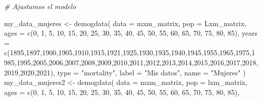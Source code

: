 \documentclass[
]{article}
\newenvironment{Shaded}{\begin{snugshade}}{\end{snugshade}}
\newcommand{\AttributeTok}[1]{\textcolor[rgb]{0.77,0.63,0.00}{#1}}
\newcommand{\CommentTok}[1]{\textcolor[rgb]{0.56,0.35,0.01}{\textit{#1}}}
\newcommand{\DecValTok}[1]{\textcolor[rgb]{0.00,0.00,0.81}{#1}}
\newcommand{\FunctionTok}[1]{\textcolor[rgb]{0.00,0.00,0.00}{#1}}
\newcommand{\NormalTok}[1]{#1}
\newcommand{\OtherTok}[1]{\textcolor[rgb]{0.56,0.35,0.01}{#1}}
\newcommand{\StringTok}[1]{\textcolor[rgb]{0.31,0.60,0.02}{#1}}
\begin{document}
\begin{Shaded}
\begin{Highlighting}[]
\CommentTok{\# Ajustamos el modelo }

\NormalTok{my\_data\_mujeres }\OtherTok{\textless{}{-}} \FunctionTok{demogdata}\NormalTok{(}
  \AttributeTok{data =}\NormalTok{ mxm\_matrix,           }
  \AttributeTok{pop =}\NormalTok{ Lxm\_matrix,}
  \AttributeTok{ages =} \FunctionTok{c}\NormalTok{(}\DecValTok{0}\NormalTok{, }\DecValTok{1}\NormalTok{, }\DecValTok{5}\NormalTok{, }\DecValTok{10}\NormalTok{, }\DecValTok{15}\NormalTok{, }\DecValTok{20}\NormalTok{, }\DecValTok{25}\NormalTok{, }\DecValTok{30}\NormalTok{, }\DecValTok{35}\NormalTok{, }\DecValTok{40}\NormalTok{, }\DecValTok{45}\NormalTok{, }\DecValTok{50}\NormalTok{, }\DecValTok{55}\NormalTok{, }\DecValTok{60}\NormalTok{, }\DecValTok{65}\NormalTok{, }\DecValTok{70}\NormalTok{, }\DecValTok{75}\NormalTok{, }\DecValTok{80}\NormalTok{, }\DecValTok{85}\NormalTok{),       }
  \AttributeTok{years =} \FunctionTok{c}\NormalTok{(}\DecValTok{1895}\NormalTok{,}\DecValTok{1897}\NormalTok{,}\DecValTok{1900}\NormalTok{,}\DecValTok{1905}\NormalTok{,}\DecValTok{1910}\NormalTok{,}\DecValTok{1915}\NormalTok{,}\DecValTok{1921}\NormalTok{,}\DecValTok{1925}\NormalTok{,}\DecValTok{1930}\NormalTok{,}\DecValTok{1935}\NormalTok{,}\DecValTok{1940}\NormalTok{,}\DecValTok{1945}\NormalTok{,}\DecValTok{1955}\NormalTok{,}\DecValTok{1965}\NormalTok{,}\DecValTok{1975}\NormalTok{,}\DecValTok{1985}\NormalTok{,}\DecValTok{1995}\NormalTok{,}\DecValTok{2005}\NormalTok{,}\DecValTok{2006}\NormalTok{,}\DecValTok{2007}\NormalTok{,}\DecValTok{2008}\NormalTok{,}\DecValTok{2009}\NormalTok{,}\DecValTok{2010}\NormalTok{,}\DecValTok{2011}\NormalTok{,}\DecValTok{2012}\NormalTok{,}\DecValTok{2013}\NormalTok{,}\DecValTok{2014}\NormalTok{,}\DecValTok{2015}\NormalTok{,}\DecValTok{2016}\NormalTok{,}\DecValTok{2017}\NormalTok{,}\DecValTok{2018}\NormalTok{,}\DecValTok{2019}\NormalTok{,}\DecValTok{2020}\NormalTok{,}\DecValTok{2021}\NormalTok{),   }
  \AttributeTok{type =} \StringTok{"mortality"}\NormalTok{,  }
  \AttributeTok{label =} \StringTok{"Mis datos"}\NormalTok{,}
  \AttributeTok{name =} \StringTok{"Mujeres"}
\NormalTok{)}
\NormalTok{my\_data\_mujeres2 }\OtherTok{\textless{}{-}} \FunctionTok{demogdata}\NormalTok{(}
  \AttributeTok{data =}\NormalTok{ mxm\_matrix,          }
  \AttributeTok{pop =}\NormalTok{ lxm\_matrix,}
  \AttributeTok{ages =} \FunctionTok{c}\NormalTok{(}\DecValTok{0}\NormalTok{, }\DecValTok{1}\NormalTok{, }\DecValTok{5}\NormalTok{, }\DecValTok{10}\NormalTok{, }\DecValTok{15}\NormalTok{, }\DecValTok{20}\NormalTok{, }\DecValTok{25}\NormalTok{, }\DecValTok{30}\NormalTok{, }\DecValTok{35}\NormalTok{, }\DecValTok{40}\NormalTok{, }\DecValTok{45}\NormalTok{, }\DecValTok{50}\NormalTok{, }\DecValTok{55}\NormalTok{, }\DecValTok{60}\NormalTok{, }\DecValTok{65}\NormalTok{, }\DecValTok{70}\NormalTok{, }\DecValTok{75}\NormalTok{, }\DecValTok{80}\NormalTok{, }\DecValTok{85}\NormalTok{),       }

\end{Highlighting}
\end{Shaded}
\end{document}
